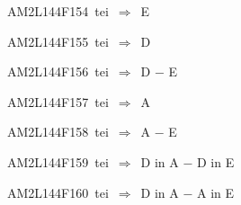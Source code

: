 {\sixrm AM2L144F154\ {\sixit tei}\ }$\Rightarrow$\ {\tenit E}\par\smallskip
{\sixrm AM2L144F155\ {\sixit tei}\ }$\Rightarrow$\ {\tenit D}\par\smallskip
{\sixrm AM2L144F156\ {\sixit tei}\ }$\Rightarrow$\ {\tenit D} − {\tenit E}\par\smallskip
{\sixrm AM2L144F157\ {\sixit tei}\ }$\Rightarrow$\ {\tenit A}\par\smallskip
{\sixrm AM2L144F158\ {\sixit tei}\ }$\Rightarrow$\ {\tenit A} − {\tenit E}\par\smallskip
{\sixrm AM2L144F159\ {\sixit tei}\ }$\Rightarrow$\ {\tenit D} {\tenit in} {\tenit A} − {\tenit D}
{\tenit in} {\tenit E}\par\smallskip
{\sixrm AM2L144F160\ {\sixit tei}\ }$\Rightarrow$\ {\tenit D} {\tenit in} {\tenit A} − {\tenit A} {\tenit in} {\tenit E}\par\smallskip

